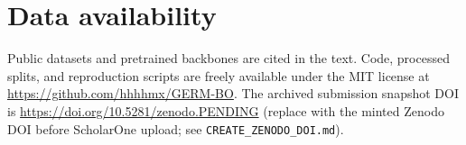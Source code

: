 \documentclass[numsec,webpdf,modern,large]{oup-authoring-template}
\theoremstyle{thmstyleone}
\theoremstyle{thmstylethree}
\begin{document}
\section*{Data availability}
Public datasets and pretrained backbones are cited in the text. Code, processed splits, and reproduction scripts are freely available under the MIT license at \url{https://github.com/hhhhmx/GERM-BO}. The archived submission snapshot DOI is \url{https://doi.org/10.5281/zenodo.PENDING} (replace with the minted Zenodo DOI before ScholarOne upload; see \texttt{CREATE\_ZENODO\_DOI.md}).



\end{document}
